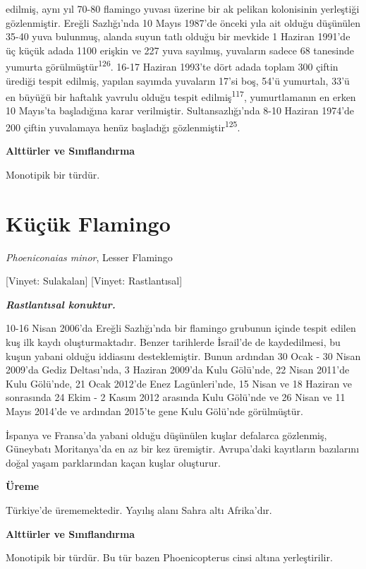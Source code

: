 \documentclass[
  letterpaper,
  DIV=11,
  numbers=noendperiod]{scrreprt}
\begin{document}
edilmiş, aynı yıl 70-80 flamingo yuvası üzerine bir ak pelikan
kolonisinin yerleştiği gözlenmiştir. Ereğli Sazlığı'nda 10 Mayıs 1987'de
önceki yıla ait olduğu düşünülen 35-40 yuva bulunmuş, alanda suyun tatlı
olduğu bir mevkide 1 Haziran 1991'de üç küçük adada 1100 erişkin ve 227
yuva sayılmış, yuvaların sadece 68 tanesinde yumurta
görülmüştür\textsuperscript{126}. 16-17 Haziran 1993'te dört adada
toplam 300 çiftin ürediği tespit edilmiş, yapılan sayımda yuvaların
17'si boş, 54'ü yumurtalı, 33'ü en büyüğü bir haftalık yavrulu olduğu
tespit edilmiş\textsuperscript{117}, yumurtlamanın en erken 10 Mayıs'ta
başladığına karar verilmiştir. Sultansazlığı'nda 8-10 Haziran 1974'de
200 çiftin yuvalamaya henüz başladığı gözlenmiştir\textsuperscript{125}.

\textbf{Alttürler ve Sınıflandırma}

Monotipik bir türdür.

\section{Küçük Flamingo}\label{kuxfcuxe7uxfck-flamingo}

\emph{Phoeniconaias minor}, Lesser Flamingo

{[}Vinyet: Sulakalan{]} {[}Vinyet: Rastlantısal{]}

\textbf{\emph{Rastlantısal konuktur.}}

10-16 Nisan 2006'da Ereğli Sazlığı'nda bir flamingo grubunun içinde
tespit edilen kuş ilk kaydı oluşturmaktadır. Benzer tarihlerde İsrail'de
de kaydedilmesi, bu kuşun yabani olduğu iddiasını desteklemiştir. Bunun
ardından 30 Ocak - 30 Nisan 2009'da Gediz Deltası'nda, 3 Haziran 2009'da
Kulu Gölü'nde, 22 Nisan 2011'de Kulu Gölü'nde, 21 Ocak 2012'de Enez
Lagünleri'nde, 15 Nisan ve 18 Haziran ve sonrasında 24 Ekim - 2 Kasım
2012 arasında Kulu Gölü'nde ve 26 Nisan ve 11 Mayıs 2014'de ve ardından
2015'te gene Kulu Gölü'nde görülmüştür.

İspanya ve Fransa'da yabani olduğu düşünülen kuşlar defalarca gözlenmiş,
Güneybatı Moritanya'da en az bir kez üremiştir. Avrupa'daki kayıtların
bazılarını doğal yaşam parklarından kaçan kuşlar oluşturur.

\textbf{Üreme}

Türkiye'de ürememektedir. Yayılış alanı Sahra altı Afrika'dır.

\textbf{Alttürler ve Sınıflandırma}

Monotipik bir türdür. Bu tür bazen Phoenicopterus cinsi altına
yerleştirilir.
\end{document}
